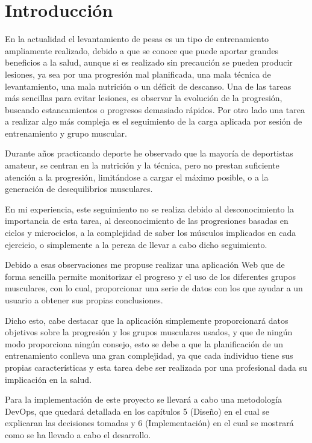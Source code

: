 \chapter{Introducción}
En la actualidad el levantamiento de pesas es un tipo de entrenamiento ampliamente realizado, debido a que se conoce que puede aportar grandes beneficios a la salud, aunque si es realizado sin precaución se pueden producir lesiones, ya sea por una progresión mal planificada, una mala técnica de levantamiento, una mala nutrición o un déficit de descanso. Una de las tareas más sencillas para evitar lesiones, es observar la evolución de la progresión, buscando estancamientos o progresos demasiado rápidos. Por otro lado una tarea a realizar algo más compleja es el seguimiento de la carga aplicada por sesión de entrenamiento y grupo muscular.

Durante años practicando deporte he observado que la mayoría de deportistas amateur, se centran en la nutrición y la técnica, pero no prestan suficiente atención a la progresión, limitándose a cargar el máximo posible, o a la generación de desequilibrios musculares. 

En mi experiencia, este seguimiento no se realiza debido al desconocimiento la importancia de esta tarea, al desconocimiento de las progresiones basadas en ciclos y \glspl{microciclo}, a la complejidad de saber los músculos implicados en cada ejercicio, o simplemente a la pereza de llevar a cabo dicho seguimiento.

Debido a esas observaciones me propuse realizar una aplicación Web que de forma sencilla permite monitorizar el progreso y el uso de los diferentes grupos musculares, con lo cual, proporcionar una serie de datos con los que ayudar a un usuario a obtener sus propias conclusiones.

Dicho esto, cabe destacar que la aplicación simplemente proporcionará datos objetivos sobre la progresión y los grupos musculares usados, y que de ningún modo proporciona ningún consejo, esto se debe a que la planificación de un entrenamiento conlleva una gran complejidad, ya que cada individuo tiene sus propias características y esta tarea debe ser realizada por una profesional dada su implicación en la salud.

Para la implementación de este proyecto se llevará a cabo una metodología \gls{DevOps}, que quedará detallada en los capítulos 5 (Diseño) en el cual se explicaran las decisiones tomadas y 6 (Implementación) en el cual se mostrará como se ha llevado a cabo el desarrollo.

